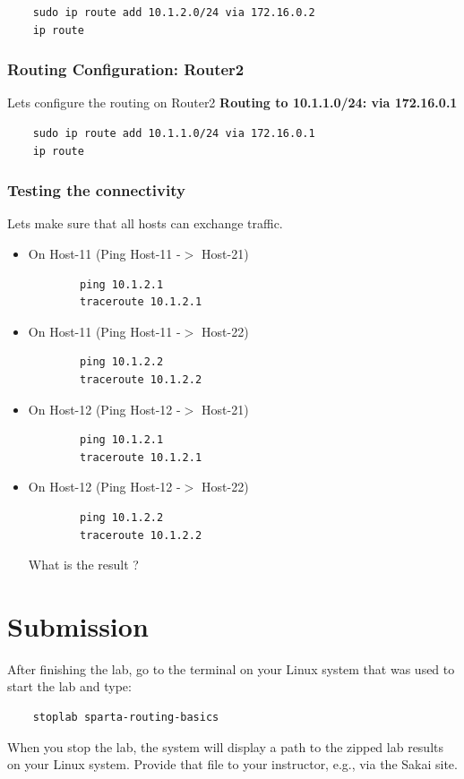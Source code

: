 \begin{verbatim}
    sudo ip route add 10.1.2.0/24 via 172.16.0.2
    ip route
\end{verbatim}

\subsubsection{Routing Configuration: Router2}
Lets configure the routing on Router2
\newline
\newline
\textbf{Routing to 10.1.1.0/24: via 172.16.0.1}

\begin{verbatim}
    sudo ip route add 10.1.1.0/24 via 172.16.0.1
    ip route
\end{verbatim}

\subsubsection{Testing the connectivity}
Lets make sure that all hosts can exchange traffic.
\newline
\begin{itemize}
	\item On Host-11 (Ping Host-11 -$>$ Host-21)
	\begin{verbatim}
	    ping 10.1.2.1
	    traceroute 10.1.2.1
	\end{verbatim}

	\item On Host-11 (Ping Host-11 -$>$ Host-22)
	\begin{verbatim}
	    ping 10.1.2.2
	    traceroute 10.1.2.2
	\end{verbatim}

	\item On Host-12 (Ping Host-12 -$>$ Host-21)
	\begin{verbatim}
	    ping 10.1.2.1
	    traceroute 10.1.2.1
	\end{verbatim}

	\item On Host-12 (Ping Host-12 -$>$ Host-22)
	\begin{verbatim}
	    ping 10.1.2.2
	    traceroute 10.1.2.2
	\end{verbatim}

	What is the result ?
\end{itemize}

\section{Submission}
After finishing the lab, go to the terminal on your Linux system that was used to start the lab and type:
\begin{verbatim}
    stoplab sparta-routing-basics
\end{verbatim}
When you stop the lab, the system will display a path to the zipped lab results on your Linux system.  Provide that file to
your instructor, e.g., via the Sakai site.


